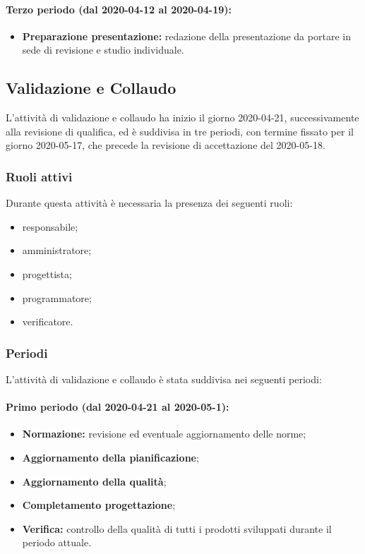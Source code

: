 				\paragraph{Terzo periodo (dal 2020-04-12 al 2020-04-19):}
				
					\begin{itemize}
						\item \textbf{Preparazione presentazione:} redazione della presentazione da portare in sede di revisione e studio individuale.
					\end{itemize}
		
		\subsection{Validazione e Collaudo}	
		
			L'attività di validazione e collaudo ha inizio il giorno 2020-04-21, successivamente alla revisione di qualifica, ed è suddivisa in tre periodi, con termine fissato per il giorno 2020-05-17, che precede la revisione di accettazione del 2020-05-18.
			
			\subsubsection{Ruoli attivi}
			
			Durante questa attività è necessaria la presenza dei seguenti ruoli:
			\begin{itemize}
				\item responsabile;
				\item amministratore;
				\item progettista;
				\item programmatore;
				\item verificatore.
			\end{itemize}
			
			\subsubsection{Periodi}
			
				L'attività di validazione e collaudo è stata suddivisa nei seguenti periodi:
		
				\paragraph{Primo periodo (dal 2020-04-21 al 2020-05-1):}
			
					\begin{itemize}
						\item \textbf{Normazione:} revisione ed eventuale aggiornamento delle norme;
						\item \textbf{Aggiornamento della pianificazione};
						\item \textbf{Aggiornamento della qualità};
						\item \textbf{Completamento progettazione};
						\item \textbf{Verifica:} controllo della qualità di tutti i prodotti sviluppati durante il periodo attuale.
					\end{itemize} 	
				
